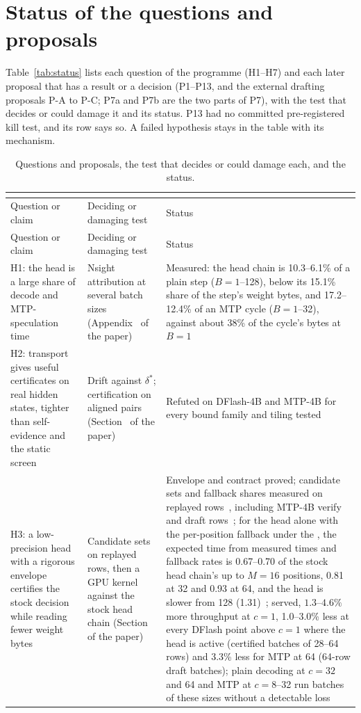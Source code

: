\section{Status of the questions and proposals}\label{app:status}\label{sec:falsifiers}\label{sec:hypotheses}
Table~\ref{tab:status} lists each question of the programme (H1--H7) and each later proposal that has a result or a decision (P1--P13, and the external drafting proposals P-A to P-C; P7a and P7b are the two parts of P7), with the test that decides or could damage it and its status. P13 had no committed pre-registered kill test, and its row says so. A failed hypothesis stays in the table with its mechanism.

{\small
\begin{longtable}{@{}P{5.2cm}P{4.6cm}P{6.5cm}@{}}
\caption{Questions and proposals, the test that decides or could damage each, and the status.}\label{tab:status}\label{tab:failures}\label{tab:hypotheses}\\
\toprule Question or claim & Deciding or damaging test & Status\\\midrule\endfirsthead
\toprule Question or claim & Deciding or damaging test & Status\\\midrule\endhead
\bottomrule\endlastfoot
H1: the head is a large share of decode and MTP-speculation time & Nsight attribution at several batch sizes (Appendix~ of the paper) & Measured: the head chain is 10.3--6.1\% of a plain step ($B=1$--128), below its 15.1\% share of the step's weight bytes, and 17.2--12.4\% of an MTP cycle ($B=1$--32), against about 38\% of the cycle's bytes at $B=1$~\\
H2: transport gives useful certificates on real hidden states, tighter than self-evidence and the static screen & Drift against $\delta^\ast$; certification on aligned pairs (Section~ of the paper) & Refuted on DFlash-4B and MTP-4B for every bound family and tiling tested~\\
H3: a low-precision head with a rigorous envelope certifies the stock decision while reading fewer weight bytes & Candidate sets on replayed rows, then a GPU kernel against the stock head chain (Section~ of the paper) & Envelope and contract proved; candidate sets and fallback shares measured on replayed rows~, including MTP-4B verify and draft rows~; for the head alone with the per-position fallback under the \modelcons{}, the expected time from measured times and fallback rates is 0.67--0.70 of the stock head chain's up to $M=16$ positions, 0.81 at 32 and 0.93 at 64, and the head is slower from 128 (1.31)~; served, $1.3$--$4.6\%$ more throughput at $c=1$, 1.0--3.0\% less at every DFlash point above $c=1$ where the head is active (certified batches of 28--64 rows) and 3.3\% less for MTP at 64 (64-row draft batches); plain decoding at $c=32$ and 64 and MTP at $c=8$--32 run batches of these sizes without a detectable loss~\\

\end{longtable}}
